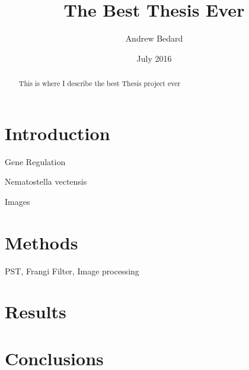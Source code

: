 \documentclass[10pt,a4paper]{article}
\title{The Best Thesis Ever}
\author{Andrew Bedard}
\date{July 2016}
\begin{document}
\maketitle

\begin{abstract}
	This is where I describe the best Thesis project ever
\end{abstract}

\section{Introduction}

Gene Regulation

Nematostella vectensis

Images
	
\section{Methods}
	PST, Frangi Filter, Image processing
	
\section{Results}
\section{Conclusions}
\end{document}
